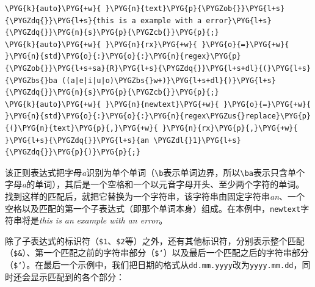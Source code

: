 \begin{codeblockbg}
\begin{Verbatim}[commandchars=\\\{\},breaklines=true,breakanywhere=true,fontsize=\codefont,xleftmargin=17bp]
\PYG{k}{auto}\PYG{+w}{ }\PYG{n}{text}\PYG{p}{\PYGZob{}}\PYG{l+s}{\PYGZdq{}}\PYG{l+s}{this is a example with a error}\PYG{l+s}{\PYGZdq{}}\PYG{n}{s}\PYG{p}{\PYGZcb{}}\PYG{p}{;}
\PYG{k}{auto}\PYG{+w}{ }\PYG{n}{rx}\PYG{+w}{ }\PYG{o}{=}\PYG{+w}{ }\PYG{n}{std}\PYG{o}{:}\PYG{o}{:}\PYG{n}{regex}\PYG{p}{\PYGZob{}}\PYG{l+s+sa}{R}\PYG{l+s}{\PYGZdq{}}\PYG{l+s+dl}{(}\PYG{l+s}{\PYGZbs{}ba ((a|e|i|u|o)\PYGZbs{}w+)}\PYG{l+s+dl}{)}\PYG{l+s}{\PYGZdq{}}\PYG{n}{s}\PYG{p}{\PYGZcb{}}\PYG{p}{;}
\PYG{k}{auto}\PYG{+w}{ }\PYG{n}{newtext}\PYG{+w}{ }\PYG{o}{=}\PYG{+w}{ }\PYG{n}{std}\PYG{o}{:}\PYG{o}{:}\PYG{n}{regex\PYGZus{}replace}\PYG{p}{(}\PYG{n}{text}\PYG{p}{,}\PYG{+w}{ }\PYG{n}{rx}\PYG{p}{,}\PYG{+w}{ }\PYG{l+s}{\PYGZdq{}}\PYG{l+s}{an \PYGZdl{}1}\PYG{l+s}{\PYGZdq{}}\PYG{p}{)}\PYG{p}{;}
\end{Verbatim}
\end{codeblockbg}



该正则表达式把字母\textit{a}识别为单个单词（\texttt{\textbackslash{}b}表示单词边界，所以\texttt{\textbackslash{}ba}表示只含单个字母\textit{a}的单词），其后是一个空格和一个以元音字母开头、至少两个字符的单词。找到这样的匹配后，就把它替换为一个字符串，该字符串由固定字符串\textit{an}、一个空格以及匹配的第一个子表达式（即那个单词本身）组成。在本例中，\texttt{newtext}字符串将是\textit{this is an} \textit{example with an error}。



除了子表达式的标识符（\texttt{\$1}、\texttt{\$2}等）之外，还有其他标识符，分别表示整个匹配（\texttt{\$\&}）、第一个匹配之前的字符串部分（\texttt{\$`}）以及最后一个匹配之后的字符串部分（\texttt{\$‘}）。在最后一个示例中，我们把日期的格式从\texttt{dd.\allowbreak{}mm.\allowbreak{}yyyy}改为\texttt{yyyy.\allowbreak{}mm.\allowbreak{}dd}，同时还会显示匹配到的各个部分：




